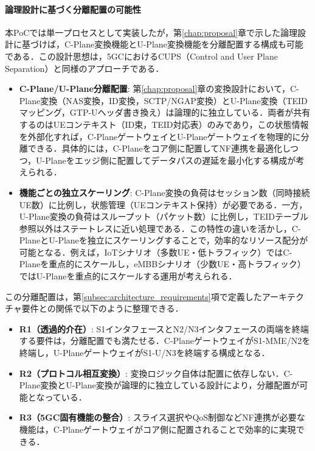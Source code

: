 \paragraph{論理設計に基づく分離配置の可能性}
本PoCでは単一プロセスとして実装したが，第\ref{chap:proposal}章で示した論理設計に基づけば，C-Plane変換機能とU-Plane変換機能を分離配置する構成も可能である．この設計思想は，5GCにおけるCUPS（Control and User Plane Separation）と同様のアプローチである．

\begin{itemize}
    \item \textbf{C-Plane/U-Plane分離配置}: 第\ref{chap:proposal}章の変換設計において，C-Plane変換（NAS変換，ID変換，SCTP/NGAP変換）とU-Plane変換（TEIDマッピング，GTP-Uヘッダ書き換え）は論理的に独立している．両者が共有するのはUEコンテキスト（ID束，TEID対応表）のみであり，この状態情報を外部化すれば，C-PlaneゲートウェイとU-Planeゲートウェイを物理的に分離できる．具体的には，C-Planeをコア側に配置してNF連携を最適化しつつ，U-Planeをエッジ側に配置してデータパスの遅延を最小化する構成が考えられる．

    \item \textbf{機能ごとの独立スケーリング}: C-Plane変換の負荷はセッション数（同時接続UE数）に比例し，状態管理（UEコンテキスト保持）が必要である．一方，U-Plane変換の負荷はスループット（パケット数）に比例し，TEIDテーブル参照以外はステートレスに近い処理である．この特性の違いを活かし，C-PlaneとU-Planeを独立にスケーリングすることで，効率的なリソース配分が可能となる．例えば，IoTシナリオ（多数UE・低トラフィック）ではC-Planeを重点的にスケールし，eMBBシナリオ（少数UE・高トラフィック）ではU-Planeを重点的にスケールする運用が考えられる．
\end{itemize}

この分離配置は，第\ref{subsec:architecture_requirements}項で定義したアーキテクチャ要件との関係で以下のように整理できる．

\begin{itemize}
    \item \textbf{R1（透過的介在）}: S1インタフェースとN2/N3インタフェースの両端を終端する要件は，分離配置でも満たせる．C-PlaneゲートウェイがS1-MME/N2を終端し，U-PlaneゲートウェイがS1-U/N3を終端する構成となる．
    \item \textbf{R2（プロトコル相互変換）}: 変換ロジック自体は配置に依存しない．C-Plane変換とU-Plane変換が論理的に独立している設計により，分離配置が可能となっている．
    \item \textbf{R3（5GC固有機能の整合）}: スライス選択やQoS制御などNF連携が必要な機能は，C-Planeゲートウェイがコア側に配置されることで効率的に実現できる．
\end{itemize}

